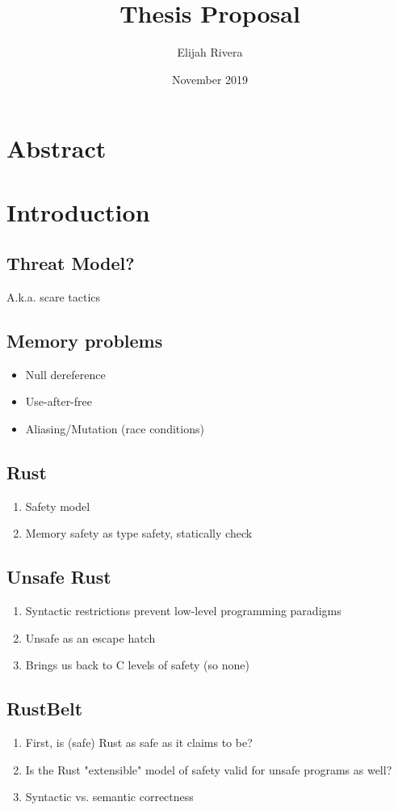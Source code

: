 \documentclass{article}
\title{Thesis Proposal}
\author{Elijah Rivera}
\date{November 2019}
\begin{document}
\maketitle

\section{Abstract}

\section{Introduction}
\subsection{Threat Model?}
A.k.a. scare tactics

\subsection{Memory problems}
\begin{itemize}
    \item Null dereference
    \item Use-after-free
    \item Aliasing/Mutation (race conditions)
\end{itemize}

\subsection{Rust}
\begin{enumerate}
    \item Safety model
    \item Memory safety as type safety, statically check
\end{enumerate}

\subsection{Unsafe Rust}
\begin{enumerate}
    \item Syntactic restrictions prevent low-level programming paradigms
    \item Unsafe as an escape hatch
    \item Brings us back to C levels of safety (so none)
\end{enumerate}

\subsection{RustBelt}
\begin{enumerate}
    \item First, is (safe) Rust as safe as it claims to be?
    \item Is the Rust "extensible" model of safety valid for unsafe programs as well?
    \item Syntactic vs. semantic correctness
\end{enumerate}
\end{document}
